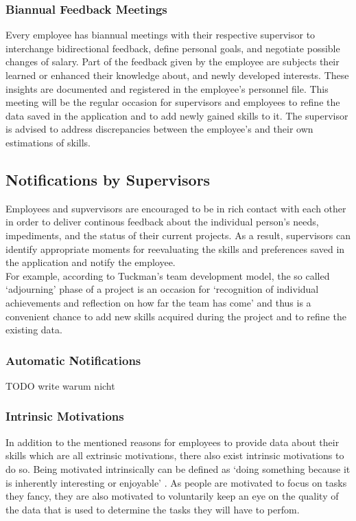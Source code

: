 \subsubsection{Biannual Feedback Meetings}
Every employee has biannual meetings with their respective supervisor to interchange
bidirectional feedback, define personal goals, and negotiate possible changes of salary.
Part of the feedback given by the employee are subjects their learned or enhanced their knowledge about, and newly developed interests. These insights are documented and registered in the employee's personnel file.
This meeting will be the regular occasion for supervisors and employees to refine the data saved in the application and to add
newly gained skills to it. The supervisor is advised to address discrepancies between the employee's and their own estimations of skills.

\subsection{Notifications by Supervisors}
Employees and supvervisors are encouraged to be in rich contact with each other in order to deliver continous feedback
about the individual person's needs, impediments, and the status of their current projects.
As a result, supervisors can identify appropriate moments for reevaluating the skills and preferences saved in the application and notify the employee.\\
For example, according to Tuckman's team development model, the so called `adjourning' phase of a project is an occasion for `recognition of individual achievements and reflection on how far the team has come' \cite[P. 3]{Wilson} and thus is a convenient chance to add new skills acquired during the project and to refine the existing data.

\subsubsection{Automatic Notifications}
TODO write warum nicht

\subsubsection{Intrinsic Motivations}
In addition to the mentioned reasons for employees to provide data about their skills which are all extrinsic motivations,
there also exist intrinsic motivations to do so. Being motivated intrinsically can be defined as `doing something because it is inherently interesting or enjoyable' \cite{RYAN200054}. As people are motivated to focus on tasks they fancy, they are also motivated to voluntarily keep an eye on the quality of the data that is used to determine the tasks they will have to perfom.


